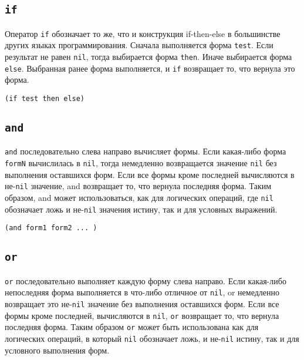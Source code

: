 \subsection{\texttt{if}}
Оператор \texttt{if} обозначает то же, что и конструкция if-then-else в большинстве других языках программирования. Сначала выполняется форма \texttt{test}. Если результат не равен \texttt{nil}, тогда выбирается форма \texttt{then}. Иначе выбирается форма \texttt{else}. Выбранная ранее форма выполняется, и \texttt{if} возвращает то, что вернула это форма.

\begin{code}
\begin{verbatim}
(if test then else)
\end{verbatim}
\end{code}

\subsection{\texttt{and}}
\texttt{and} последовательно слева направо вычисляет формы. Если какая-либо форма \texttt{formN} вычислилась в \texttt{nil}, тогда немедленно возвращается значение \texttt{nil} без выполнения оставшихся форм. Если все формы кроме последней вычисляются в не-\texttt{nil} значение, and возвращает то, что вернула последняя форма. Таким образом, and может использоваться, как для логических операций, где \texttt{nil} обозначает ложь и не-\texttt{nil} значения истину, так и для условных выражений.

\begin{code}
\begin{verbatim}
(and form1 form2 ... )
\end{verbatim}
\end{code}

\subsection{\texttt{or}}
\texttt{or} последовательно выполняет каждую форму слева направо. Если какая-либо непоследняя форма выполняется в что-либо отличное от \texttt{nil}, or немедленно возвращает это не-\texttt{nil} значение без выполнения оставшихся форм. Если все формы кроме последней, вычисляются в \texttt{nil}, \texttt{or} возвращает то, что вернула последняя форма. Таким образом \texttt{or} может быть использована как для логических операций, в который \texttt{nil} обозначает ложь, и не-\texttt{nil} истину, так и для условного выполнения форм.

